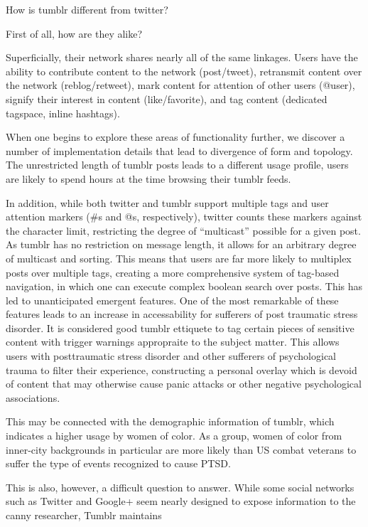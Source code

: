 How is tumblr different from twitter?

First of all, how are they alike?

Superficially, their network shares nearly all of the same linkages.  
Users have the ability to contribute content to the network (post/tweet), 
retransmit content over the network (reblog/retweet), mark content for 
attention of other users (@user), signify their interest in content 
(like/favorite), and tag content (dedicated tagspace, inline hashtags).

When one begins to explore these areas of functionality further, we 
discover a number of implementation details that lead to divergence 
of form and topology.  The unrestricted length of tumblr posts leads to 
a different usage profile, users are likely to spend hours at the 
time\cite{duggan2013demographics} browsing their tumblr feeds.  

In addition, while both twitter and tumblr support multiple tags and 
user attention markers (#s and @s, respectively), twitter counts these 
markers against the character limit, restricting the degree of 
``multicast'' possible for a given post.  As tumblr has no restriction 
on message length, it allows for an arbitrary degree of multicast and 
sorting.  This means that users are far more likely to multiplex posts 
over multiple tags, creating a more comprehensive system of tag-based 
navigation, in which one can execute complex boolean search over posts.  
This has led to unanticipated emergent features. One of the most 
remarkable of these features leads to an increase in accessability for 
sufferers of post traumatic stress disorder.  It is considered good 
tumblr ettiquete to tag certain pieces of sensitive content with trigger 
warnings appropraite to the subject matter.  This allows users with 
posttraumatic stress disorder and other sufferers of psychological 
trauma to filter their experience, constructing a personal overlay 
which is devoid of content that may otherwise cause panic attacks or 
other negative psychological associations.


This may be connected with the demographic information of tumblr, which 
indicates a higher usage by women of color.  As a group, women of color 
from inner-city backgrounds in particular are more likely than US combat 
veterans to suffer the type of events recognized to cause PTSD.


This is also, however, a difficult question to answer.  While some 
social networks such as Twitter and Google+ seem nearly designed to 
expose information to the canny researcher, Tumblr maintains 
 
